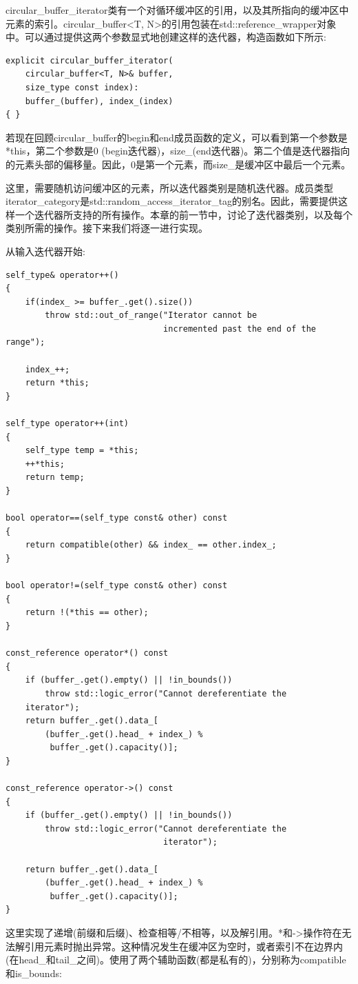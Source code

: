 circular\_buffer\_iterator类有一个对循环缓冲区的引用，以及其所指向的缓冲区中元素的索引。circular\_buffer<T, N>的引用包装在std::reference\_wrapper对象中。可以通过提供这两个参数显式地创建这样的迭代器，构造函数如下所示:

\begin{lstlisting}[style=styleCXX]
explicit circular_buffer_iterator(
	circular_buffer<T, N>& buffer,
	size_type const index):
	buffer_(buffer), index_(index)
{ }
\end{lstlisting}

若现在回顾circular\_buffer的begin和end成员函数的定义，可以看到第一个参数是*this，第二个参数是0 (begin迭代器)，size\_(end迭代器)。第二个值是迭代器指向的元素头部的偏移量。因此，0是第一个元素，而size\_是缓冲区中最后一个元素。

这里，需要随机访问缓冲区的元素，所以迭代器类别是随机迭代器。成员类型iterator\_category是std::random\_access\_iterator\_tag的别名。因此，需要提供这样一个迭代器所支持的所有操作。本章的前一节中，讨论了迭代器类别，以及每个类别所需的操作。接下来我们将逐一进行实现。

从输入迭代器开始:

\begin{lstlisting}[style=styleCXX]
self_type& operator++()
{
	if(index_ >= buffer_.get().size())
		throw std::out_of_range("Iterator cannot be
								incremented past the end of the range");
								
	index_++;
	return *this;
}

self_type operator++(int)
{
	self_type temp = *this;
	++*this;
	return temp;
}

bool operator==(self_type const& other) const
{
	return compatible(other) && index_ == other.index_;
}

bool operator!=(self_type const& other) const
{
	return !(*this == other);
}

const_reference operator*() const
{
	if (buffer_.get().empty() || !in_bounds())
		throw std::logic_error("Cannot dereferentiate the
	iterator");
	return buffer_.get().data_[
		(buffer_.get().head_ + index_) %
		 buffer_.get().capacity()];
}

const_reference operator->() const
{
	if (buffer_.get().empty() || !in_bounds())
		throw std::logic_error("Cannot dereferentiate the
								iterator");
								
	return buffer_.get().data_[
		(buffer_.get().head_ + index_) %
		 buffer_.get().capacity()];
}
\end{lstlisting}

这里实现了递增(前缀和后缀)、检查相等/不相等，以及解引用。*和->操作符在无法解引用元素时抛出异常。这种情况发生在缓冲区为空时，或者索引不在边界内(在head\_和tail\_之间)。使用了两个辅助函数(都是私有的)，分别称为compatible和is\_bounds:

